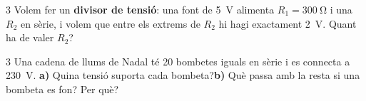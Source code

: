 \begin{exercici}{3}
Volem fer un \textbf{divisor de tensió}: una font de \SI{5}{V} alimenta $R_1 = \SI{300}{\ohm}$ i una $R_2$ en sèrie, i volem que entre els extrems de $R_2$ hi hagi exactament \SI{2}{V}. Quant ha de valer $R_2$?
\end{exercici}

\begin{exercici}{3}
Una cadena de llums de Nadal té \num{20} bombetes iguals en sèrie i es connecta a \SI{230}{V}.
\textbf{a)} Quina tensió suporta cada bombeta?\quad \textbf{b)} Què passa amb la resta si una bombeta es fon? Per què?
\end{exercici}